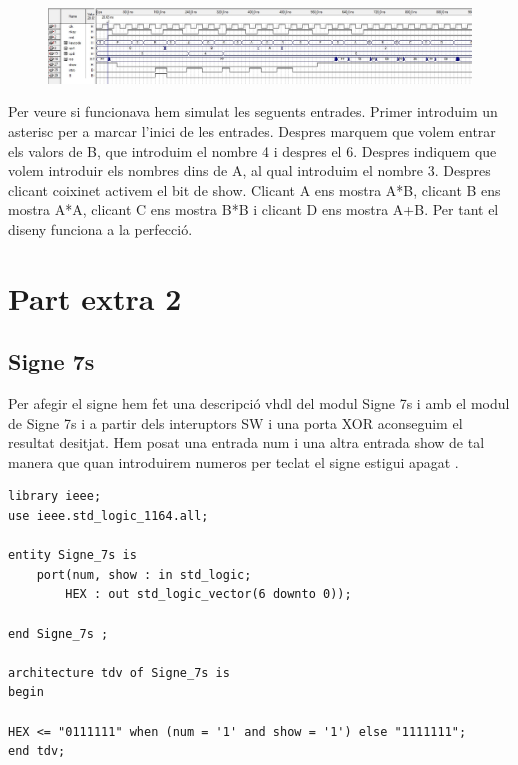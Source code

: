 \documentclass[12pt, a4papre]{article}
\begin{document}
	\begin{figure}[H]
		\begin{center}
		\includegraphics[width=130mm]{SimPpalExtra.jpeg}
		\end{center}
	\end{figure}
	
	Per veure si funcionava hem simulat les seguents entrades. Primer introduim un asterisc per a marcar l'inici de les entrades. Despres marquem que volem entrar els valors de B, que introduim el nombre 4 i despres el 6. Despres indiquem que volem introduir els nombres dins de A, al qual introduim el nombre 3. Despres clicant coixinet activem el bit de show. Clicant A ens mostra A*B, clicant B ens mostra A*A, clicant C ens mostra B*B i clicant D ens mostra A+B. Per tant el diseny funciona a la perfecció.
	
	

\section{Part extra 2}

\subsection{Signe 7s}
	Per afegir el signe hem fet una descripció vhdl del modul Signe 7s i amb el modul de Signe 7s i a partir dels interuptors SW i una porta XOR aconseguim el resultat desitjat. Hem posat una entrada num i una altra entrada show de tal manera que quan introduirem numeros per teclat el signe estigui apagat .

	\begin{lstlisting}[style=vhdl, frame=single, basicstyle=\tiny]
library ieee;
use ieee.std_logic_1164.all;

entity Signe_7s is 
	port(num, show : in std_logic;
		HEX : out std_logic_vector(6 downto 0));
		
end Signe_7s ;

architecture tdv of Signe_7s is
begin

HEX <= "0111111" when (num = '1' and show = '1') else "1111111";
end tdv;
\end{lstlisting}
\end{document}
